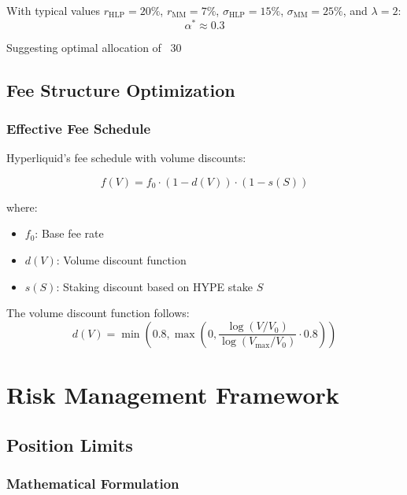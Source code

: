 \documentclass[11pt,a4paper]{article}
\theoremstyle{definition}
\begin{document}
With typical values $r_{\text{HLP}} = 20\%$, $r_{\text{MM}} = 7\%$, $\sigma_{\text{HLP}} = 15\%$, $\sigma_{\text{MM}} = 25\%$, and $\lambda = 2$:
\begin{equation}
\alpha^* \approx 0.3
\end{equation}

Suggesting optimal allocation of ~30%

\subsection{Fee Structure Optimization}

\subsubsection{Effective Fee Schedule}

Hyperliquid's fee schedule with volume discounts:

\begin{equation}
f(V) = f_0 \cdot \left(1 - d(V)\right) \cdot \left(1 - s(S)\right)
\end{equation}

where:
\begin{itemize}
    \item $f_0$: Base fee rate
    \item $d(V)$: Volume discount function
    \item $s(S)$: Staking discount based on HYPE stake $S$
\end{itemize}

The volume discount function follows:
\begin{equation}
d(V) = \min\left(0.8, \max\left(0, \frac{\log(V/V_0)}{\log(V_{\max}/V_0)} \cdot 0.8\right)\right)
\end{equation}

\section{Risk Management Framework}

\subsection{Position Limits}

\subsubsection{Mathematical Formulation}
\end{document}
